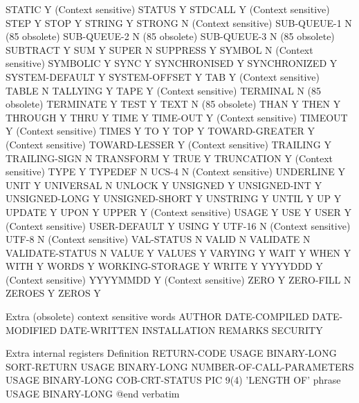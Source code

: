 STATIC				Y (Context sensitive)
STATUS				Y
STDCALL				Y (Context sensitive)
STEP				Y
STOP				Y
STRING				Y
STRONG				N (Context sensitive)
SUB-QUEUE-1			N (85 obsolete)
SUB-QUEUE-2			N (85 obsolete)
SUB-QUEUE-3			N (85 obsolete)
SUBTRACT			Y
SUM				Y
SUPER				N
SUPPRESS			Y
SYMBOL				N (Context sensitive)
SYMBOLIC			Y
SYNC				Y
SYNCHRONISED			Y
SYNCHRONIZED			Y
SYSTEM-DEFAULT			Y
SYSTEM-OFFSET			Y
TAB				Y (Context sensitive)
TABLE				N
TALLYING			Y
TAPE				Y (Context sensitive)
TERMINAL			N (85 obsolete)
TERMINATE			Y
TEST				Y
TEXT				N (85 obsolete)
THAN				Y
THEN				Y
THROUGH				Y
THRU				Y
TIME				Y
TIME-OUT			Y (Context sensitive)
TIMEOUT				Y (Context sensitive)
TIMES				Y
TO				Y
TOP				Y
TOWARD-GREATER			Y (Context sensitive)
TOWARD-LESSER			Y (Context sensitive)
TRAILING			Y
TRAILING-SIGN			N
TRANSFORM			Y
TRUE				Y
TRUNCATION			Y (Context sensitive)
TYPE				Y
TYPEDEF				N
UCS-4				N (Context sensitive)
UNDERLINE			Y
UNIT				Y
UNIVERSAL			N
UNLOCK				Y
UNSIGNED			Y
UNSIGNED-INT			Y
UNSIGNED-LONG			Y
UNSIGNED-SHORT			Y
UNSTRING			Y
UNTIL				Y
UP				Y
UPDATE				Y
UPON				Y
UPPER				Y (Context sensitive)
USAGE				Y
USE				Y
USER				Y (Context sensitive)
USER-DEFAULT			Y
USING				Y
UTF-16				N (Context sensitive)
UTF-8				N (Context sensitive)
VAL-STATUS			N
VALID				N
VALIDATE			N
VALIDATE-STATUS			N
VALUE				Y
VALUES				Y
VARYING				Y
WAIT				Y
WHEN				Y
WITH				Y
WORDS				Y
WORKING-STORAGE			Y
WRITE				Y
YYYYDDD				Y (Context sensitive)
YYYYMMDD			Y (Context sensitive)
ZERO				Y
ZERO-FILL			N
ZEROES				Y
ZEROS				Y

Extra (obsolete) context sensitive words
AUTHOR
DATE-COMPILED
DATE-MODIFIED
DATE-WRITTEN
INSTALLATION
REMARKS
SECURITY

Extra internal registers	Definition
RETURN-CODE			USAGE BINARY-LONG
SORT-RETURN			USAGE BINARY-LONG
NUMBER-OF-CALL-PARAMETERS	USAGE BINARY-LONG
COB-CRT-STATUS			PIC 9(4)
'LENGTH OF' phrase		USAGE BINARY-LONG
@end verbatim


